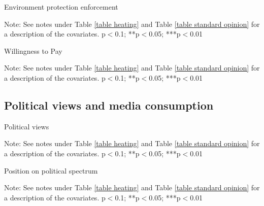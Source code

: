 \documentclass{article}
\begin{document}
\begin{table}[h!]
	\caption{Environment protection enforcement}
	\begin{center}
		\scalebox{0.7}{}
	\end{center}
	{\footnotesize Note: See notes under Table \ref{table heating} and Table \ref{table standard opinion} for a description of the covariates.
	\newline *p$<$0.1; **p$<$0.05; ***p$<$0.01}
\end{table}	

\begin{table}[h!]
	\caption{Willingness to Pay}
	\begin{center}
		\scalebox{0.7}{}
	\end{center}
	{\footnotesize Note: See notes under Table \ref{table heating} and Table \ref{table standard opinion} for a description of the covariates.
	\newline *p$<$0.1; **p$<$0.05; ***p$<$0.01}
\end{table}	

\clearpage
\subsection{Political views and media consumption}

\begin{table}[h!]
	\caption{Political views}
	\begin{center}
		\scalebox{0.7}{}
	\end{center}
	{\footnotesize Note: See notes under Table \ref{table heating} and Table \ref{table standard opinion} for a description of the covariates.
	\newline *p$<$0.1; **p$<$0.05; ***p$<$0.01}
\end{table}	

\begin{landscape}
	\begin{table}[h!]
	\caption{Position on political spectrum}
	\begin{center}
		\scalebox{0.6}{}
	\end{center}
	{\footnotesize Note: See notes under Table \ref{table heating} and Table \ref{table standard opinion} for a description of the covariates.
	\newline *p$<$0.1; **p$<$0.05; ***p$<$0.01}
\end{table}	
\end{landscape}
\end{document}
